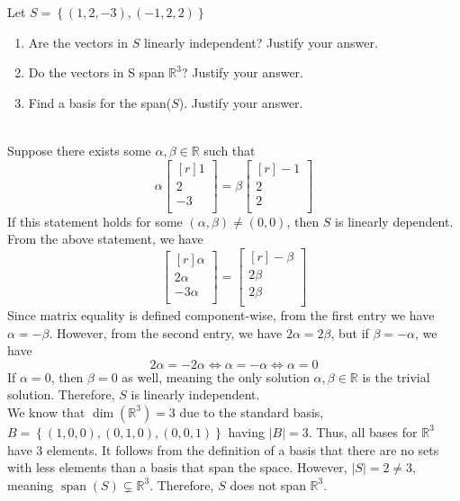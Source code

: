 \documentclass{article}
\begin{document}
\newpage
{} Let $S =\left\{(1, 2, -3), (-1, 2, 2)\right\}$ 
\begin{enumerate}
\item Are the vectors in $S$ linearly independent? Justify your answer. 
\item Do the vectors in S span $\mathbb{R}^3$? Justify your answer.
\item Find a basis for the span($S$). Justify your answer.
\end{enumerate}
\noindent\makebox[\linewidth]{\rule{\linewidth}{0.4pt}}\\
Suppose there exists some \(\alpha ,\beta \in\mathbb{R} \) such that 
\[
  \alpha \begin{bmatrix}[r]
     1 \\
     2 \\
     -3 \\
  \end{bmatrix}= \beta \begin{bmatrix}[r]
     -1 \\
      2\\
      2\\
  \end{bmatrix}
\]
If this statement holds for some \((\alpha ,\beta )\neq (0,0)\), then \(S\) is linearly dependent. From the above statement, we have
\[
  \begin{bmatrix}[r]
     \alpha  \\
     2\alpha  \\
     -3\alpha  \\
  \end{bmatrix}=\begin{bmatrix}[r]
     -\beta  \\
      2\beta \\
      2\beta \\
  \end{bmatrix}
\]
Since matrix equality is defined component-wise, from the first entry we have \(\alpha =-\beta \). However, from the second entry, we have \(2\alpha =2\beta \), but if \(\beta =-\alpha\), we have 
\[
  2\alpha =-2\alpha \iff \alpha =-\alpha \iff \alpha =0
\]
If \(\alpha =0\), then \(\beta =0\) as well, meaning the only solution \(\alpha ,\beta \in\mathbb{R} \) is the trivial solution. Therefore, \(S\) is linearly independent.\\
We know that \(\dim \left( \mathbb{R} ^3 \right) =3\) due to the standard basis, \(B=\left\{ (1,0,0),(0,1,0),(0,0,1) \right\} \) having \(|B| =3\). Thus, all bases for \(\mathbb{R} ^3\) have 3 elements. It follows from the definition of a basis that there are no sets with less elements than a basis that span the space. However, \(|S| =2\neq 3\), meaning \(\operatorname{span}(S) \subsetneq \mathbb{R} ^3 \). Therefore, \(S\) does not span \(\mathbb{R} ^3\).\\
\end{document}
